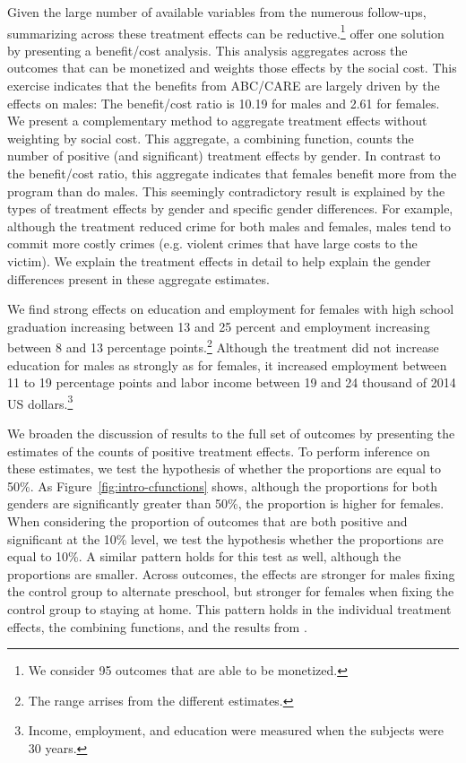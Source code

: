 Given the large number of available variables from the numerous follow-ups, summarizing across these treatment effects can be reductive.\footnote{We consider 95 outcomes that are able to be monetized.} \citet{Garcia_etal_2016_Comp_CBA_Unpublished} offer one solution by presenting a benefit/cost analysis. This analysis aggregates across the outcomes that can be monetized and weights those effects by the social cost. This exercise indicates that the benefits from ABC/CARE are largely driven by the effects on males: The benefit/cost ratio is 10.19 for males and 2.61 for females. We present a complementary method to aggregate treatment effects without weighting by social cost. This aggregate, a combining function, counts the number of positive (and significant) treatment effects by gender. In contrast to the benefit/cost ratio, this aggregate indicates that females benefit more from the program than do males. This seemingly contradictory result is explained by the types of treatment effects by gender and specific gender differences. For example, although the treatment reduced crime for both males and females, males tend to commit more costly crimes (e.g. violent crimes that have large costs to the victim). We explain the treatment effects in detail to help explain the gender differences present in these aggregate estimates.

We find strong effects on education and employment for females with high school graduation increasing between 13 and 25 percent and employment increasing between 8 and 13 percentage points.\footnote{The range arrises from the different estimates.} Although the treatment did not increase education for males as strongly as for females, it increased employment between 11 to 19 percentage points and labor income between 19 and 24 thousand of 2014 US dollars.\footnote{Income, employment, and education were measured when the subjects were 30 years.} 

We broaden the discussion of results to the full set of outcomes by presenting the estimates of the counts of positive treatment effects. To perform inference on these estimates, we test the hypothesis of whether the proportions are equal to 50\%. As Figure~\ref{fig:intro-cfunctions} shows, although the proportions for both genders are significantly greater than 50\%, the proportion is higher for females. When considering the proportion of outcomes that are both positive and significant at the 10\% level, we test the hypothesis whether the proportions are equal to 10\%. A similar pattern holds for this test as well, although the proportions are smaller. Across outcomes, the effects are stronger for males fixing the control group to alternate preschool, but stronger for females when fixing the control group to staying at home. This pattern holds in the individual treatment effects, the combining functions, and the results from \citet{Garcia_etal_2016_Comp_CBA_Unpublished}.

